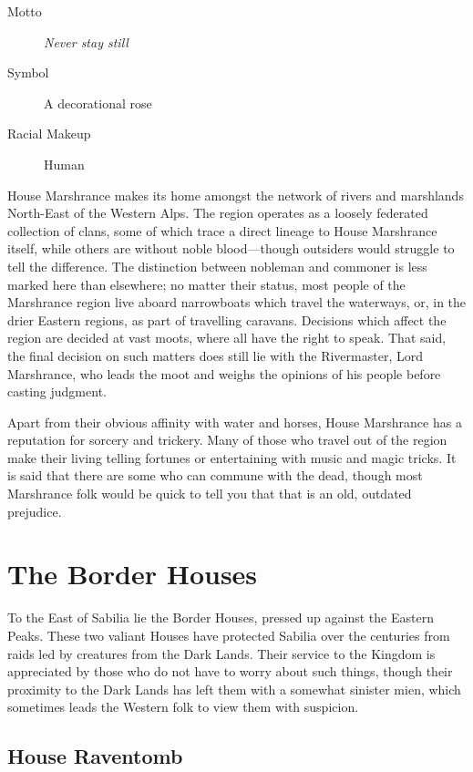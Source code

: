 \documentclass[10pt,twoside,openright,a4paper,twocolumn]{book}
\begin{document}
\begin{description}
\item[Motto] \textit{Never stay still}

\item[Symbol] A decorational rose

\item[Racial Makeup] Human
\end{description}

House Marshrance makes its home amongst the network of rivers and marshlands
North-East of the Western Alps.  The region operates as a loosely federated
collection of clans, some of which trace a direct lineage to House Marshrance
itself, while others are without noble blood---though outsiders would struggle to
tell the difference.  The distinction between nobleman and commoner is less marked
here than elsewhere; no matter their status, most people of the Marshrance region
live aboard narrowboats which travel the waterways, or, in the drier Eastern regions,
as part of travelling caravans.  Decisions which affect the region are decided at vast
moots, where all have the right to speak.  That said, the final decision on such matters
does still lie with the Rivermaster, Lord Marshrance, who leads the moot and weighs the opinions of his people before casting judgment.

Apart from their obvious affinity with water and horses, House Marshrance has a
reputation for sorcery and trickery.  Many of those who travel out of the region make
their living telling fortunes or entertaining with music and magic tricks.  It is said that
there are some who can commune with the dead, though most Marshrance folk would
be quick to tell you that that is an old, outdated prejudice.

\section{The Border Houses}

To the East of Sabilia lie the Border Houses, pressed up against the Eastern
Peaks.  These two valiant Houses have protected Sabilia over the centuries from
raids led by creatures from the Dark Lands.  Their service to the Kingdom is
appreciated by those who do not have to worry about such things, though their
proximity to the Dark Lands has left them with a somewhat sinister mien, which
sometimes leads the Western folk to view them with suspicion.

\subsection*{House Raventomb}
\end{document}
